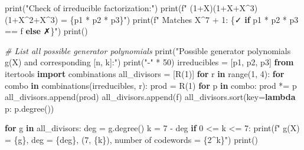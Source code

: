 \documentclass[
]{article}
\newenvironment{Shaded}{}{}
\newcommand{\BuiltInTok}[1]{\textcolor[rgb]{0.00,0.50,0.00}{#1}}
\newcommand{\CommentTok}[1]{\textcolor[rgb]{0.38,0.63,0.69}{\textit{#1}}}
\newcommand{\ControlFlowTok}[1]{\textcolor[rgb]{0.00,0.44,0.13}{\textbf{#1}}}
\newcommand{\DecValTok}[1]{\textcolor[rgb]{0.25,0.63,0.44}{#1}}
\newcommand{\ImportTok}[1]{\textcolor[rgb]{0.00,0.50,0.00}{\textbf{#1}}}
\newcommand{\KeywordTok}[1]{\textcolor[rgb]{0.00,0.44,0.13}{\textbf{#1}}}
\newcommand{\NormalTok}[1]{#1}
\newcommand{\OperatorTok}[1]{\textcolor[rgb]{0.40,0.40,0.40}{#1}}
\newcommand{\SpecialCharTok}[1]{\textcolor[rgb]{0.25,0.44,0.63}{#1}}
\newcommand{\SpecialStringTok}[1]{\textcolor[rgb]{0.73,0.40,0.53}{#1}}
\newcommand{\StringTok}[1]{\textcolor[rgb]{0.25,0.44,0.63}{#1}}
\begin{document}
\begin{Shaded}
\begin{Highlighting}[]
\BuiltInTok{print}\NormalTok{(}\StringTok{"Check of irreducible factorization:"}\NormalTok{)}
\BuiltInTok{print}\NormalTok{(}\SpecialStringTok{f"  (1+X)(1+X+X\^{}3)(1+X\^{}2+X\^{}3) = }\SpecialCharTok{\{}\NormalTok{p1 }\OperatorTok{*}\NormalTok{ p2 }\OperatorTok{*}\NormalTok{ p3}\SpecialCharTok{\}}\SpecialStringTok{"}\NormalTok{)}
\BuiltInTok{print}\NormalTok{(}\SpecialStringTok{f"  Matches X\^{}7 + 1: }\SpecialCharTok{\{}\StringTok{\textquotesingle{}✓\textquotesingle{}} \ControlFlowTok{if}\NormalTok{ p1 }\OperatorTok{*}\NormalTok{ p2 }\OperatorTok{*}\NormalTok{ p3 }\OperatorTok{==}\NormalTok{ f }\ControlFlowTok{else} \StringTok{\textquotesingle{}✗\textquotesingle{}}\SpecialCharTok{\}}\SpecialStringTok{"}\NormalTok{)}
\BuiltInTok{print}\NormalTok{()}

\CommentTok{\# List all possible generator polynomials}
\BuiltInTok{print}\NormalTok{(}\StringTok{"Possible generator polynomials g(X) and corresponding [n, k]:"}\NormalTok{)}
\BuiltInTok{print}\NormalTok{(}\StringTok{"{-}"} \OperatorTok{*} \DecValTok{50}\NormalTok{)}
\NormalTok{irreducibles }\OperatorTok{=}\NormalTok{ [p1, p2, p3]}
\ImportTok{from}\NormalTok{ itertools }\ImportTok{import}\NormalTok{ combinations}
\NormalTok{all\_divisors }\OperatorTok{=}\NormalTok{ [R(}\DecValTok{1}\NormalTok{)]}
\ControlFlowTok{for}\NormalTok{ r }\KeywordTok{in} \BuiltInTok{range}\NormalTok{(}\DecValTok{1}\NormalTok{, }\DecValTok{4}\NormalTok{):}
    \ControlFlowTok{for}\NormalTok{ combo }\KeywordTok{in}\NormalTok{ combinations(irreducibles, r):}
\NormalTok{        prod }\OperatorTok{=}\NormalTok{ R(}\DecValTok{1}\NormalTok{)}
        \ControlFlowTok{for}\NormalTok{ p }\KeywordTok{in}\NormalTok{ combo:}
\NormalTok{            prod }\OperatorTok{*=}\NormalTok{ p}
\NormalTok{        all\_divisors.append(prod)}
\NormalTok{all\_divisors.append(f)}
\NormalTok{all\_divisors.sort(key}\OperatorTok{=}\KeywordTok{lambda}\NormalTok{ p: p.degree())}

\ControlFlowTok{for}\NormalTok{ g }\KeywordTok{in}\NormalTok{ all\_divisors:}
\NormalTok{    deg }\OperatorTok{=}\NormalTok{ g.degree()}
\NormalTok{    k }\OperatorTok{=} \DecValTok{7} \OperatorTok{{-}}\NormalTok{ deg}
    \ControlFlowTok{if} \DecValTok{0} \OperatorTok{\textless{}=}\NormalTok{ k }\OperatorTok{\textless{}=} \DecValTok{7}\NormalTok{:}
        \BuiltInTok{print}\NormalTok{(}\SpecialStringTok{f"  g(X) = }\SpecialCharTok{\{}\NormalTok{g}\SpecialCharTok{\}}\SpecialStringTok{,  deg = }\SpecialCharTok{\{}\NormalTok{deg}\SpecialCharTok{\}}\SpecialStringTok{,  (7, }\SpecialCharTok{\{}\NormalTok{k}\SpecialCharTok{\}}\SpecialStringTok{),  number of codewords = }\SpecialCharTok{\{}\DecValTok{2}\OperatorTok{\^{}}\NormalTok{k}\SpecialCharTok{\}}\SpecialStringTok{"}\NormalTok{)}
\BuiltInTok{print}\NormalTok{()}


\end{Highlighting}
\end{Shaded}
\end{document}

